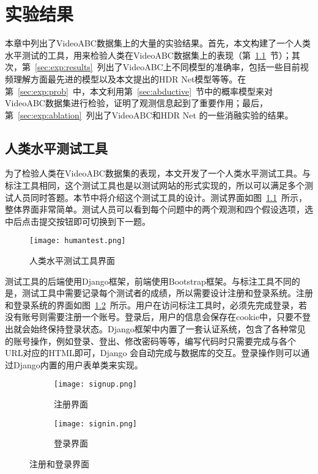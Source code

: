 
\chapter{实验结果}\label{cha:experimetns}
本章中列出了VideoABC数据集上的大量的实验结果。首先，本文构建了一个人类水平测试的工具，用来检验人类在VideoABC数据集上的表现（第~\ref{sec:exp:humantest}~节）；其次，第~\ref{sec:exp:results}~列出了VideoABC上不同模型的准确率，包括一些目前视频理解方面最先进的模型以及本文提出的HDR Net模型等等。在第~\ref{sec:exp:prob}~中，本文利用第~\ref{sec:abductive}~节中的概率模型来对VideoABC数据集进行检验，证明了观测信息起到了重要作用；最后，第~\ref{sec:exp:ablation}~列出了VideoABC和HDR Net 的一些消融实验的结果。

\section{人类水平测试工具}\label{sec:exp:humantest}
为了检验人类在VideoABC数据集的表现，本文开发了一个人类水平测试工具。与标注工具相同，这个测试工具也是以测试网站的形式实现的，所以可以满足多个测试人员同时答题。本节中将介绍这个测试工具的设计。测试界面如图~\ref{fig:humantest}~所示，整体界面非常简单。测试人员可以看到每个问题中的两个观测和四个假设选项，选中后点击提交按钮即可切换到下一题。
\begin{figure}[htbp]
    \centering
    \texttt{[image: humantest.png]}
    \caption{人类水平测试工具界面}
    \label{fig:humantest}
\end{figure}
测试工具的后端使用Django框架，前端使用Bootstrap框架。与标注工具不同的是，测试工具中需要记录每个测试者的成绩，所以需要设计注册和登录系统。注册和登录系统的界面如图~\ref{fig:sign}~所示。用户在访问标注工具时，必须先完成登录，若没有账号则需要注册一个账号。登录后，用户的信息会保存在cookie中，只要不登出就会始终保持登录状态。Django框架中内置了一套认证系统，包含了各种常见的账号操作，例如登录、登出、修改密码等等，编写代码时只需要完成与各个URL对应的HTML即可，Django 会自动完成与数据库的交互。登录操作则可以通过Django内置的用户表单类来实现。

\begin{figure}[htbp]
    \centering
    \begin{subfigure}{.5\textwidth}
        \texttt{[image: signup.png]}
        \caption{注册界面}
    \end{subfigure}%
    \begin{subfigure}{.5\textwidth}
        \texttt{[image: signin.png]}
        \caption{登录界面}
    \end{subfigure}%
    \caption{注册和登录界面}
    \label{fig:sign}
\end{figure}

